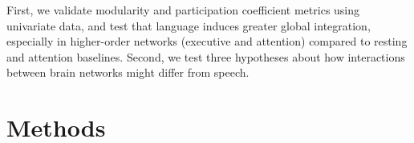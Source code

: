 


First, we validate modularity and participation coefficient metrics using univariate data, and test that language induces greater global integration, especially in higher-order networks (executive and attention) compared to resting and attention baselines. Second, we test three hypotheses about how interactions between brain networks might differ from speech.

\section{Methods}

